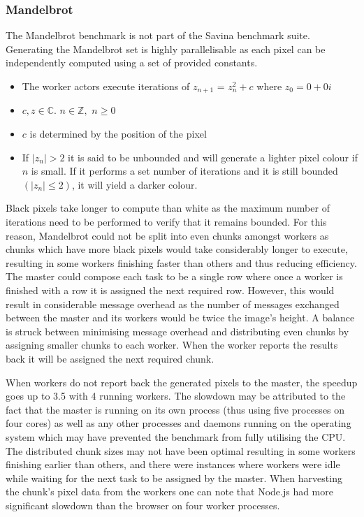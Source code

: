 \documentclass[12pt, a4paper]{report}
\theoremstyle{definition}
\theoremstyle{definition}%
\theoremstyle{definition}%
\theoremstyle{definition}%
\theoremstyle{definition}%
\theoremstyle{definition}%
\begin{document}
\subsubsection{Mandelbrot}
The Mandelbrot benchmark is not part of the Savina benchmark suite. Generating the Mandelbrot set is highly parallelisable as each pixel can be independently computed using a set of provided constants. 
\begin{itemize}
    \item The worker actors execute iterations of $z_{n+1}$ = $z_{n}^{2}+c$ where $z_0 = 0 + 0i$
    \item $c, z \in \mathbb{C}$. $n \in \mathbb{Z},$ $n \ge 0$
    \item $c$ is determined by the position of the pixel
    \item If $|z_n|> 2$ it is said to be unbounded and will generate a lighter pixel colour if $n$ is small. If it performs a set number of iterations and it is still bounded $(|z_n| \le 2)$, it will yield a darker colour.
\end{itemize}
Black pixels take longer to compute than white as the maximum number of iterations need to be performed to verify that it remains bounded. For this reason, Mandelbrot could not be split into even chunks amongst workers as chunks which have more black pixels would take considerably longer to execute, resulting in some workers finishing faster than others and thus reducing efficiency. The master could compose each task to be a single row where once a worker is finished with a row it is assigned the next required row. However, this would result in considerable message overhead as the number of messages exchanged between the master and its workers would be twice the image's height. A balance is struck between minimising message overhead and distributing even chunks by assigning smaller chunks to each worker. When the worker reports the results back it will be assigned the next required chunk.

When workers do not report back the generated pixels to the master, the speedup goes up to 3.5 with 4 running workers. The slowdown may be attributed to the fact that the master is running on its own process (thus using five processes on four cores) as well as any other processes and daemons running on the operating system which may have prevented the benchmark from fully utilising the CPU. The distributed chunk sizes may not have been optimal resulting in some workers finishing earlier than others, and there were instances where workers were idle while waiting for the next task to be assigned by the master. When harvesting the chunk's pixel data from the workers one can note that Node.js had more significant slowdown than the browser on four worker processes.
\end{document}
